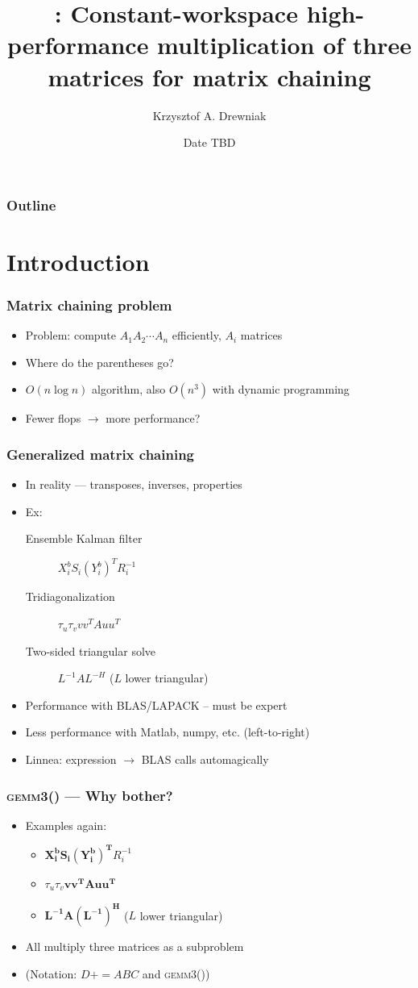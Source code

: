 \documentclass{beamer}
\title[\gemmt{}]{\gemmt{}: Constant-workspace high-performance multiplication of three matrices for matrix chaining}
\author[Drewniak]{Krzysztof A. Drewniak}
\institute[UT Austin]{The University of Texas at Austin}
\date[]{Date TBD}
\newcommand*{\pluseq}{\mathrel{{+}{=}}}
\newcommand*{\gemmt}{{\textsc{gemm3()}}}
\begin{document}
\begin{frame}[plain]
  \titlepage{}
\end{frame}

\begin{frame}
  \frametitle{Outline}
  \tableofcontents{}
\end{frame}

\section[Introduction]{Introduction}
\begin{frame}
  \frametitle{Matrix chaining problem}
  \begin{itemize}
  \item Problem: compute $A_1A_2\cdots A_n$ efficiently, $A_i$ matrices
  \item Where do the parentheses go?
  \item $O(n \log n)$ algorithm, also $O(n^3)$ with dynamic programming
  \item Fewer flops $\to$ more performance?
  \end{itemize}
\end{frame}

\begin{frame}
  \frametitle{Generalized matrix chaining}
  \begin{itemize}
  \item In reality --- transposes, inverses, properties
  \item Ex:
    \begin{description}
    \item[Ensemble Kalman filter] $X_i^b S_i (Y_i^b)^T R_i^{-1}$
    \item[Tridiagonalization] $\tau_u\tau_vvv^TAuu^T$
    \item[Two-sided triangular solve] $L^{-1}AL^{-H}$ ($L$ lower triangular)
    \end{description}
  \item Performance with BLAS/LAPACK -- must be expert
  \item Less performance with  Matlab, numpy, etc. (left-to-right)
  \item Linnea: expression $\to$ BLAS calls automagically
  \end{itemize}
\end{frame}

\begin{frame}
  \frametitle{\gemmt{} --- Why bother?}
  \begin{itemize}
  \item Examples again:
    \begin{itemize}
    \item $\bm{X_i^b S_i (Y_i^b)^T}R_i^{-1}$
    \item $\tau_u\tau_v \bm{vv^TAuu^T}$
    \item$\bm{L^{-1}A(L^{-1})^H}$ ($L$ lower triangular)
    \end{itemize}
  \item All multiply three matrices as a subproblem
  \item (Notation: $D \pluseq ABC$ and \gemmt{})
  \end{itemize}
\end{frame}
\end{document}
